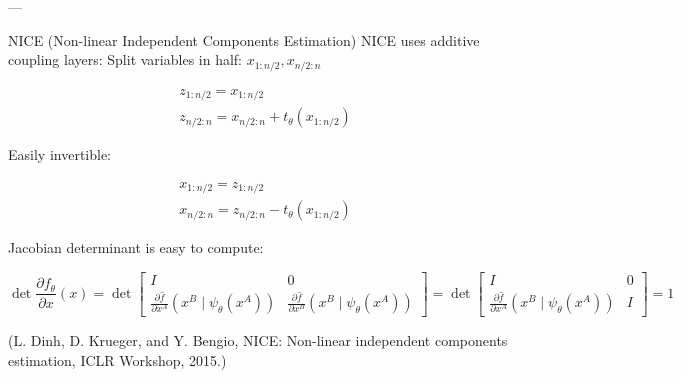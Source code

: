 \begin{frame}[allowframebreaks]

--- 

\end{frame}

\begin{frame}[allowframebreaks]

\begin{mydefinitionblock}{10.26}{NICE (Non-linear Independent Components Estimation)}
    NICE uses additive coupling layers:
    Split variables in half: $x_{1: n / 2}, x_{n / 2: n}$

    $$
    \begin{aligned}
    & z_{1: n / 2}=x_{1: n / 2} \\
    & z_{n / 2: n}=x_{n / 2: n}+t_{\theta}\left(x_{1: n / 2}\right)
    \end{aligned}
    $$

    Easily invertible:

    $$
    \begin{aligned}
    & x_{1: n / 2}=z_{1: n / 2} \\
    & x_{n / 2: n}=z_{n / 2: n}-t_{\theta}\left(x_{1: n / 2}\right)
    \end{aligned}
    $$

    Jacobian determinant is easy to compute:

    $$
    \operatorname{det} \frac{\partial f_{\theta}}{\partial x}(x)=\operatorname{det}\left[\begin{array}{cc}I & 0 \\ \frac{\partial \hat{f}}{\partial x^{A}}\left(x^{B} \mid \psi_{\theta}\left(x^{A}\right)\right) & \frac{\partial \hat{f}}{\partial x^{B}}\left(x^{B} \mid \psi_{\theta}\left(x^{A}\right)\right)\end{array}\right]=\operatorname{det}\left[\begin{array}{cc}I & 0 \\ \frac{\partial \hat{f}}{\partial x^{A}}\left(x^{B} \mid \psi_{\theta}\left(x^{A}\right)\right) & I\end{array}\right]=1
    $$

    (L. Dinh, D. Krueger, and Y. Bengio, NICE: Non-linear independent components estimation, ICLR Workshop, 2015.)
\end{mydefinitionblock}

\end{frame}

